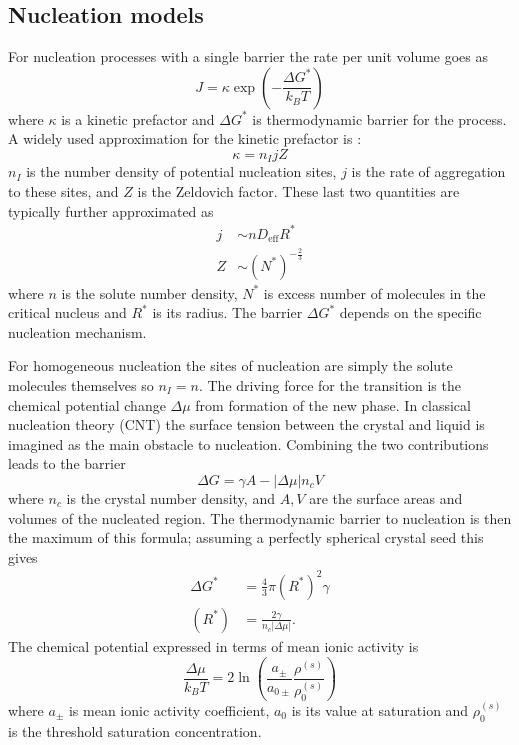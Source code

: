 \documentclass[11pt,twoside]{report}
\begin{document}
\subsection{Nucleation models}
\label{sec:cnt}

For nucleation processes with a single barrier the rate per unit volume goes as
\begin{equation}\label{eq:nucleation-rate-barrier}
  J = \kappa \exp{\left(-\frac{\Delta G^{*}}{k_B T}\right)}
\end{equation}
where $\kappa$ is a kinetic prefactor and $\Delta G^*$ is thermodynamic barrier for the process.
A widely used approximation for the kinetic prefactor is \cite{SearJPCM2007}:
\begin{equation}
  \kappa = n_I j Z
\end{equation}
$n_I$ is the number density of potential nucleation sites, $j$ is the rate of aggregation to these sites, and $Z$ is the Zeldovich factor.
These last two quantities are typically further approximated as \cite{SearJPCM2007}
\begin{subequations}
  \begin{align}
    j &\sim n D_\mathrm{eff} R^* \\
    Z &\sim (N^*)^{-\tfrac{2}{3}}
  \end{align}
\end{subequations}
where $n$ is the solute number density, $N^*$ is excess number of molecules in the critical nucleus and $R^*$ is its radius.
The barrier $\Delta G^*$ depends on the specific nucleation mechanism.

For homogeneous nucleation the sites of nucleation are simply the solute molecules themselves so $n_I = n$.
The driving force for the transition is the chemical potential change $\Delta \mu$ from formation of the new phase.
In classical nucleation theory (CNT) the surface tension between the crystal and liquid is imagined as the main obstacle to nucleation.
Combining the two contributions leads to the barrier
\begin{equation}
  \Delta G = \gamma A - |\Delta \mu| n_c V
\end{equation}
where $n_c$ is the crystal number density, and $A, V$ are the surface areas and volumes of the nucleated region.
The thermodynamic barrier to nucleation is then the maximum of this formula; assuming a perfectly spherical crystal seed this gives
\begin{align}\label{eq:cnt-barrier}
  \Delta G^{*} &= \frac{4}{3} \pi (R^{*})^2 \gamma \\
  (R^{*}) &= \frac{2\gamma}{n_c |\Delta\mu|}.
\end{align}
The chemical potential expressed in terms of mean ionic activity is\cite{DesarnaudJPCL2014}
\begin{equation}
  \frac{\Delta \mu}{k_B T}
  =
  2 \ln{\left( \frac{a_\pm}{a_{0\pm}} \frac{\rho^{(s)}}{\rho^{(s)}_0} \right)}
\end{equation}
where $a_\pm$ is mean ionic activity coefficient, $a_0$ is its value at saturation and $\rho^{(s)}_0$ is the threshold saturation concentration.
\end{document}
